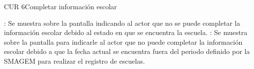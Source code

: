 \begin{UseCase}{CUR 6}{Completar información escolar}
{\begin{UClist}
     \UCli {}: Se muestra sobre la pantalla  indicando al actor que no se puede completar la información escolar debido al estado en que se encuentra la escuela.
		\UCli	{}: Se muestra sobre la pantalla  para indicarle al actor que no puede completar la información escolar debido a que la fecha actual se encuentra fuera del periodo definido por la SMAGEM para realizar el registro de escuelas.
      \end{UClist}
    }
      \end{UseCase}

